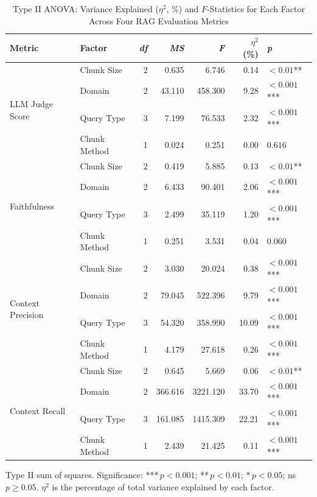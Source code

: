 
\begin{table}[!t]
  \caption{Type II ANOVA: Variance Explained ($\eta^2$, \%) and $F$-Statistics for Each Factor Across Four RAG Evaluation Metrics}
  \label{tab:anova}
  \centering
  \renewcommand{\arraystretch}{1.2}
  \begin{tabular}{llrrrrl}
    \hline
    \textbf{Metric} & \textbf{Factor} & \textbf{\textit{df}} & \textbf{\textit{MS}} & \textbf{\textit{F}} & \textbf{$\eta^2$ (\%)} & \textbf{\textit{p}} \\
    \hline
    \multirow{4}{*}{LLM Judge Score}
      & Chunk Size   & 2 & 0.635 &   6.746 &  0.14 & $< 0.01$** \\
      & Domain       & 2 & 43.110 & 458.300 &  9.28 & $< 0.001$*** \\
      & Query Type   & 3 &  7.199 &  76.533 &  2.32 & $< 0.001$*** \\
      & Chunk Method & 1 &  0.024 &   0.251 &  0.00 & $0.616$\phantom{***} \\
    \hline
    \multirow{4}{*}{Faithfulness}
      & Chunk Size   & 2 &  0.419 &   5.885 &  0.13 & $< 0.01$** \\
      & Domain       & 2 &  6.433 &  90.401 &  2.06 & $< 0.001$*** \\
      & Query Type   & 3 &  2.499 &  35.119 &  1.20 & $< 0.001$*** \\
      & Chunk Method & 1 &  0.251 &   3.531 &  0.04 & $0.060$\phantom{***} \\
    \hline
    \multirow{4}{*}{Context Precision}
      & Chunk Size   & 2 &  3.030 &  20.024 &  0.38 & $< 0.001$*** \\
      & Domain       & 2 & 79.045 & 522.396 &  9.79 & $< 0.001$*** \\
      & Query Type   & 3 & 54.320 & 358.990 & 10.09 & $< 0.001$*** \\
      & Chunk Method & 1 &  4.179 &  27.618 &  0.26 & $< 0.001$*** \\
    \hline
    \multirow{4}{*}{Context Recall}
      & Chunk Size   & 2 &  0.645 &   5.669 &  0.06 & $< 0.01$** \\
      & Domain       & 2 & 366.616 & 3221.120 & 33.70 & $< 0.001$*** \\
      & Query Type   & 3 & 161.085 & 1415.309 & 22.21 & $< 0.001$*** \\
      & Chunk Method & 1 &  2.439 &  21.425 &  0.11 & $< 0.001$*** \\
    \hline
  \end{tabular}
  \begin{tablenotes}
    \small
    \item Type II sum of squares. Significance: ***\,$p < 0.001$; **\,$p < 0.01$; *\,$p < 0.05$; ns\,$p \geq 0.05$.
    $\eta^2$ is the percentage of total variance explained by each factor.
  \end{tablenotes}
\end{table}
